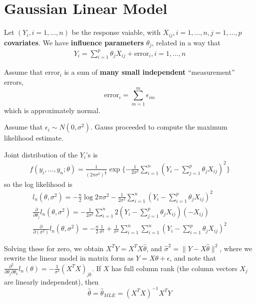 
\chapter{Gaussian Linear Model}
\label{cha:gauss-line-model}

Let $(Y_{i}, i = 1, \dots, n)$ be the response vaiable, with $X_{ij},
i = 1, \dots, n, j = 1, \dots, p$ \textbf{covariates}. We have
\textbf{influence parameters} $\theta_{j}$, related in a way that
\begin{align}
  \label{eq:100}
  Y_{i} = \sum_{i=1}^{p} \theta_{j} X_{ij} + \text{error}_{i}, i = 1,
  \dots, n
\end{align}

Assume that $\text{error}_{i}$ is a sum of \textbf{many small
  independent} ``measurement'' errors,
\begin{equation}
  \label{eq:100}
  \text{error}_{i} = \sum_{m=1}^{m} \epsilon_{im} 
\end{equation} which is approximately normal.

Assume that $\epsilon_{i} \sim N(0, \sigma^{2})$. Gauss proceeded to
compute the maximum likelihood estimate.

\begin{proposition}
  Joint distribution of the $Y_{i}$'s is
  \begin{align}
    \label{eq:100}
    f(y_{i}, \dots, y_{n}; \theta) = \frac{1}{(2 \pi
      \sigma^{2})^{\frac{1}{2}}} \exp \{ - \frac{1}{2 \sigma^{2}}
    \sum_{i=1}^{n} (Y_{i} - \sum_{j=1}^{p} \theta_{j} X_{ij})^{2} \}
  \end{align} so the log likelihood is
  \begin{align}
    \label{eq:100}
    l_{n}(\theta, \sigma^{2}) = -\frac{n}{2} \log 2 \pi \sigma^{2} -
    \frac{1}{2 \sigma^{2}} \sum_{i=1}^{n}(Y_{i}  - \sum_{i=1}^{p}
    \theta_{j} X_{ij})^{2} \\
    \frac{\partial}{\partial \theta_{j}} l_{n}(\theta, \sigma^{2}) = -
    \frac{1}{2 \sigma^{2}} \sum_{i=1}^{n} 2(Y_{i} - \sum_{j=1}^{p}
    \theta_{j} X_{ij})(-X_{ij}) \\
    \frac{\partial}{\partial (\sigma^{2})} l_{n}(\theta, \sigma^{2}) =
    - \frac{n}{2} \frac{1}{\sigma^{2}} + \frac{1}{\sigma^{4}}
    \sum_{i=1}^{n} \sum_{i=1}^{n} (Y_{i} - \sum_{i=1}^{p} \theta_{j} X_{ij})^{2}
  \end{align}

  Solving these for zero, we obtain $X^{T} Y = X^{T} X \hat \theta$,
  and $\hat \sigma^{2} = \| Y - X \hat \theta \|^{2}$, where we
  rewrite the linear model in matrix form as $Y = X \theta +
  \epsilon$, and note that $\frac{\partial^{2}}{\partial
    \theta_{j} \partial \theta_{k}} l_{n}(\theta) = -
  \frac{1}{\sigma^{2}} (X^{T} X)_{jk}$.  If $X$ has full column rank
  (the column vectors $X_{j}$ are linearly independent), then
  \begin{equation}
    \label{eq:100}
    \hat \theta = \hat \theta_{MLE} = (X^{T} X)^{-1} X^{T} Y
  \end{equation}
\end{proposition}

